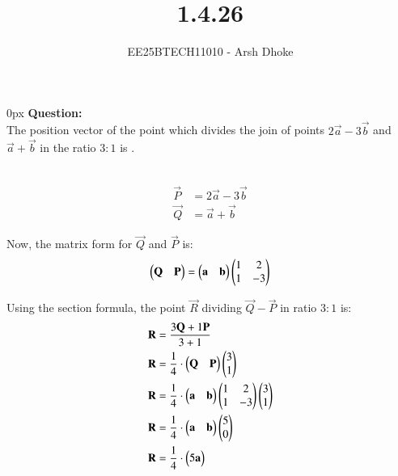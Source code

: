 \documentclass[journal]{IEEEtran}
\begin{document}

\vspace{3cm}

\title{1.4.26}
\author{EE25BTECH11010 - Arsh Dhoke}
{\let\newpage\relax\maketitle}

\renewcommand{\thefigure}{\theenumi}
\renewcommand{\thetable}{\theenumi}
\setlength{\intextsep}{10pt}
\renewcommand{\thetable}{\theenumi}

\parindent 0px
\textbf{Question:} \\
The position vector of the point which divides the join of points $2\vec{a} - 3\vec{b}$ and $\vec{a} + \vec{b}$ in the ratio $3:1$ is \underline{\hspace{2cm}}.

\solution \\

\begin{align}
    \vec{P} &= 2\vec{a}-3\vec{b}\\
    \vec{Q} &= \vec{a}+\vec{b}
\end{align}

Now, the matrix form for $\vec{Q}$ and $\vec{P}$ is:
\begin{align}
\begin{pmatrix}\mathbf{Q} & \mathbf{P}\end{pmatrix}
=\begin{pmatrix}\mathbf{a} & \mathbf{b}\end{pmatrix}
\begin{pmatrix}1 & 2 \\ 1 & -3\end{pmatrix}
\end{align}

Using the section formula, the point $\vec{R}$ dividing $\vec{Q} - \vec{P}$ in ratio $3:1$ is:
\begin{align}
\mathbf{R} &= \frac{3\mathbf{Q} + 1\mathbf{P}}{3+1} \\
\mathbf{R} &= \frac{1}{4} \cdot \begin{pmatrix}\mathbf{Q} & \mathbf{P}\end{pmatrix} \begin{pmatrix}3 \\ 1\end{pmatrix} \\
\mathbf{R} &= \frac{1}{4} \cdot \begin{pmatrix}\mathbf{a} & \mathbf{b}\end{pmatrix}\begin{pmatrix}1 & 2 \\ 1 & -3\end{pmatrix} \begin{pmatrix}3 \\ 1\end{pmatrix} \\
\mathbf{R} &= \frac{1}{4} \cdot \begin{pmatrix}\mathbf{a} & \mathbf{b}\end{pmatrix} \begin{pmatrix}5 \\ 0\end{pmatrix} \\
\mathbf{R} &= \frac{1}{4} \cdot \begin{pmatrix}5\mathbf{a}\end{pmatrix}  
\end{align}
\end{document}
